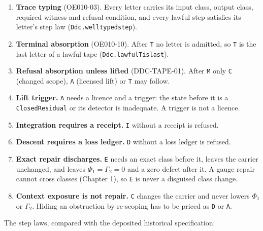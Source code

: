 \documentclass[
  11pt,
]{article}
\providecommand{\tightlist}{%
  \setlength{\itemsep}{0pt}\setlength{\parskip}{0pt}}
\renewcommand{\_}{\ddcunderscore\allowbreak}
\begin{document}
\begin{enumerate}
\def\labelenumi{\arabic{enumi}.}
\tightlist
\item
  \textbf{Trace typing} (OE010-03). Every letter carries its input
  class, output class, required witness and refusal condition, and every
  lawful step satisfies its letter's step law
  (\texttt{Ddc.\allowbreak well\_typed\_step}).
\item
  \textbf{Terminal absorption} (OE010-10). After \texttt{T} no letter is
  admitted, so \texttt{T} is the last letter of a lawful tape
  (\texttt{Ddc.\allowbreak lawful\_T\_is\_last}).
\item
  \textbf{Refusal absorption unless lifted} (DDC-TAPE-01). After
  \texttt{M} only \texttt{C} (changed scope), \texttt{Λ} (licensed lift)
  or \texttt{T} may follow.
\item
  \textbf{Lift trigger.} \texttt{Λ} needs a licence and a trigger: the
  state before it is a \texttt{Closed\allowbreak Residual} or its detector is
  inadequate. A trigger is not a licence.
\item
  \textbf{Integration requires a receipt.} \texttt{I} without a receipt
  is refused.
\item
  \textbf{Descent requires a loss ledger.} \texttt{D} without a loss
  ledger is refused.
\item
  \textbf{Exact repair discharges.} \texttt{E} needs an exact class
  before it, leaves the carrier unchanged, and leaves
  \(\Phi_1 = \Gamma_2 = 0\) and a zero defect after it. A gauge repair
  cannot cross classes (Chapter 1), so \texttt{E} is never a disguised
  class change.
\item
  \textbf{Context exposure is not repair.} \texttt{C} changes the
  carrier and never lowers \(\Phi_1\) or \(\Gamma_2\). Hiding an
  obstruction by re-scoping has to be priced as \texttt{D} or
  \texttt{Λ}.
\end{enumerate}

The step laws, compared with the deposited historical specification:
\end{document}
